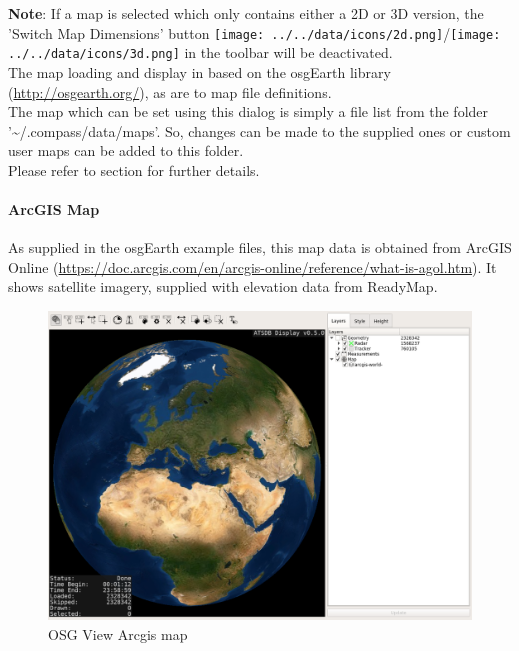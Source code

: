  \textbf{Note}: If a map is selected which only contains either a 2D or 3D version, 
 the 'Switch Map Dimensions' button \texttt{[image: ../../data/icons/2d.png]}/\texttt{[image: ../../data/icons/3d.png]} in the toolbar will be deactivated.\\
 
The map loading and display in based on the osgEarth library (\url{http://osgearth.org/}), as are to map file definitions.  \\

The map which can be set using this dialog is simply a file list from the folder '\textasciitilde/.compass/data/maps'. So, changes can be made to the supplied ones or custom user maps can be added to this folder. \\
Please refer to section  for further details.

\newpage
\paragraph{ArcGIS Map}

As supplied in the osgEarth example files, this map data is obtained from ArcGIS Online (\url{https://doc.arcgis.com/en/arcgis-online/reference/what-is-agol.htm}). It shows satellite imagery, supplied with elevation data from ReadyMap. 

\begin{figure}[H]
    \hspace*{-2.5cm}
    \includegraphics[width=19cm,frame]{figures/osgview_arcgis.png}
  \caption{OSG View Arcgis map}
\end{figure}

